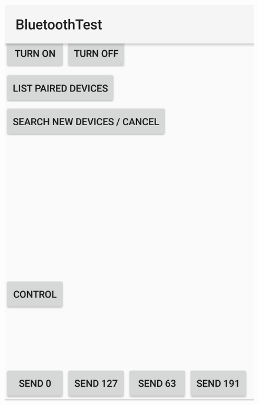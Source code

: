 \documentclass[a4paper]{article}
\begin{document}
\begin{figure}[H]
\includegraphics[scale=0.2]{Mobilapp1.png}

\end{figure}
\end{document}

